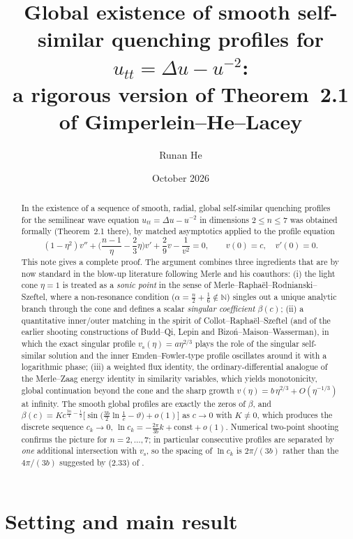 \documentclass[11pt,a4paper]{amsart}
\title[Smooth self-similar quenching profiles]{Global existence of smooth self-similar quenching profiles for $u_{tt}=\Delta u-u^{-2}$:\\ a rigorous version of Theorem~2.1 of Gimperlein--He--Lacey}
\author{Runan He}
\date{October 2026}
\theoremstyle{definition}
\theoremstyle{remark}
\newcommand{\N}{\mathbb{N}}
\newcommand{\vs}{v_{\mathrm{s}}}
\begin{document}
\begin{abstract}
In \cite{GHL22} the existence of a sequence of smooth, radial, global self-similar quenching profiles for the semilinear wave equation $u_{tt}=\Delta u-u^{-2}$ in dimensions $2\le n\le 7$ was obtained formally (Theorem~2.1 there), by matched asymptotics applied to the profile equation
\[
(1-\eta^2)v''+\Big(\frac{n-1}{\eta}-\frac{2}{3}\eta\Big)v'+\frac{2}{9}v-\frac{1}{v^2}=0,\qquad v(0)=c,\quad v'(0)=0 .
\]
This note gives a complete proof.  The argument combines three ingredients that are by now standard in the blow-up literature following Merle and his coauthors: (i) the light cone $\eta=1$ is treated as a \emph{sonic point} in the sense of Merle--Rapha\"el--Rodnianski--Szeftel, where a non-resonance condition ($\alpha=\tfrac n2+\tfrac16\notin\N$) singles out a unique analytic branch through the cone and defines a scalar \emph{singular coefficient} $\beta(c)$; (ii) a quantitative inner/outer matching in the spirit of Collot--Rapha\"el--Szeftel (and of the earlier shooting constructions of Budd--Qi, Lepin and Bizo\'n--Maison--Wasserman), in which the exact singular profile $\vs(\eta)=a\eta^{2/3}$ plays the role of the singular self-similar solution and the inner Emden--Fowler-type profile oscillates around it with a logarithmic phase; (iii) a weighted flux identity, the ordinary-differential analogue of the Merle--Zaag energy identity in similarity variables, which yields monotonicity, global continuation beyond the cone and the sharp growth $v(\eta)=b\,\eta^{2/3}+O(\eta^{-1/3})$ at infinity.  The smooth global profiles are exactly the zeros of $\beta$, and $\beta(c)=K c^{\frac{3n}{4}-\frac12}\big[\sin\big(\tfrac{3b}{2}\ln\tfrac1c-\vartheta\big)+o(1)\big]$ as $c\to0$ with $K\neq0$, which produces the discrete sequence $c_k\to0$, $\ln c_k=-\tfrac{2\pi}{3b}k+\text{const}+o(1)$.  Numerical two-point shooting confirms the picture for $n=2,\dots,7$; in particular consecutive profiles are separated by \emph{one} additional intersection with $\vs$, so the spacing of $\ln c_k$ is $2\pi/(3b)$ rather than the $4\pi/(3b)$ suggested by (2.33) of \cite{GHL22}.
\end{abstract}

\maketitle
\tableofcontents

\section{Setting and main result}\label{sec:setting}
\end{document}
